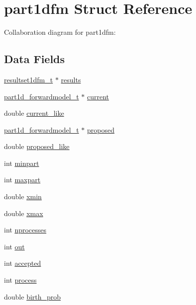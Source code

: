 \hypertarget{structpart1dfm}{}\section{part1dfm Struct Reference}
\label{structpart1dfm}


Collaboration diagram for part1dfm\+:
\subsection*{Data Fields}
\begin{DoxyCompactItemize}
\item 
\hyperlink{resultset1dfm_8h_a71ecc06ecc2e037129e00433985a6637}{resultset1dfm\+\_\+t} $\ast$ \hyperlink{structpart1dfm_ad28611315f278836b0b0a7ba25baa551}{results}
\item 
\hyperlink{part1d__forwardmodel_8h_adaad64fbca97fa82ba80fe8371e4f1d9}{part1d\+\_\+forwardmodel\+\_\+t} $\ast$ \hyperlink{structpart1dfm_ae8bf0f9687de2ce288255f721b688f99}{current}
\item 
double \hyperlink{structpart1dfm_aa8a7065c3963903b5e5ccc88489e6cb8}{current\+\_\+like}
\item 
\hyperlink{part1d__forwardmodel_8h_adaad64fbca97fa82ba80fe8371e4f1d9}{part1d\+\_\+forwardmodel\+\_\+t} $\ast$ \hyperlink{structpart1dfm_acbe95d1f9621f2ee6466e54205486e79}{proposed}
\item 
double \hyperlink{structpart1dfm_ad995ce7712c33b1710c8e250221f62a0}{proposed\+\_\+like}
\item 
int \hyperlink{structpart1dfm_a0b2fd8202f99a776de436a1e7b52fd50}{minpart}
\item 
int \hyperlink{structpart1dfm_ae2c83da1f9e4050b85dc759aa93473e8}{maxpart}
\item 
double \hyperlink{structpart1dfm_a4f2e23775e17a7de28e949745763af02}{xmin}
\item 
double \hyperlink{structpart1dfm_a96ead395f5c9aee43780a0b3af23419c}{xmax}
\item 
int \hyperlink{structpart1dfm_adab33948ead9e6b860f6c62fdf582bab}{nprocesses}
\item 
int \hyperlink{structpart1dfm_a2221ddee0c919d4f06f843ddf2c86ccf}{out}
\item 
int \hyperlink{structpart1dfm_a42fef2ae5491be7e1fed1ffac1c1bd0a}{accepted}
\item 
int \hyperlink{structpart1dfm_a849be055c11e99ecb05c9310a13b0e39}{process}
\item 
double \hyperlink{structpart1dfm_a66f33b2ec190d2e63820929f069cd658}{birth\+\_\+prob}

\end{DoxyCompactItemize}
